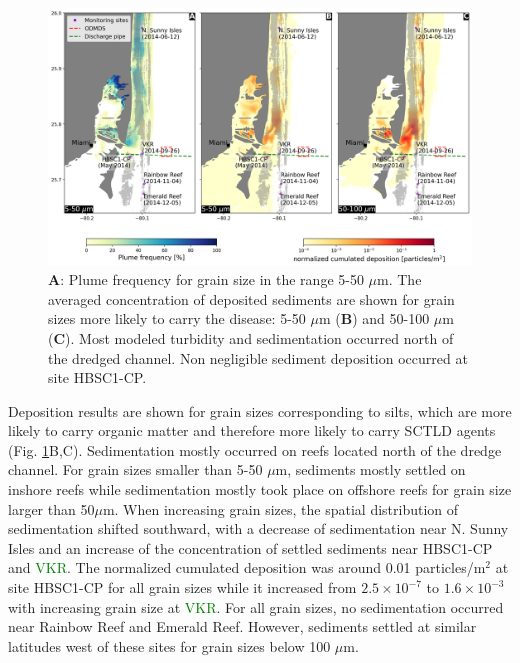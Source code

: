 \documentclass[preprint,12pt,authoryear]{elsarticle}
\newcommand{\modif}[1]{\textcolor{green}{#1}}
\begin{document}
\begin{figure}
	\centering
	\includegraphics[width=\textwidth]{figures/plume_deposition_new.png}
	\caption{\textbf{A}: Plume frequency for grain size in the range 5-50 $\mu$m. The averaged concentration of deposited sediments are shown for grain sizes more likely to carry the disease: 5-50 $\mu$m (\textbf{B}) and 50-100 $\mu$m (\textbf{C}). Most modeled turbidity and sedimentation occurred north of the dredged channel. Non negligible sediment deposition occurred at site HBSC1-CP.}
	\label{fig:onset_depo}    
\end{figure}

Deposition results are shown for grain sizes corresponding to silts, which are more likely to carry organic matter and therefore more likely to carry SCTLD agents \citep{erftemeijer2012environmental}(Fig. \ref{fig:onset_depo}B,C). Sedimentation mostly occurred on reefs located north of the dredge channel. For grain sizes smaller than 5-50 $\mu$m, sediments mostly settled on inshore reefs while sedimentation mostly took place on offshore reefs for grain size larger than 50$\mu$m. When increasing grain sizes, the spatial distribution of sedimentation shifted southward, with a decrease of sedimentation near N. Sunny Isles and an increase of the concentration of settled sediments near HBSC1-CP and \modif{VKR}. The normalized cumulated deposition was around 0.01 particles/m$^2$ at site HBSC1-CP for all grain sizes while it increased from $2.5\times 10^{-7}$ to $1.6\times 10^{-3}$ with increasing grain size at \modif{VKR}. For all grain sizes, no sedimentation occurred near Rainbow Reef and Emerald Reef. However, sediments settled at similar latitudes west of these sites for grain sizes below 100 $\mu$m.
\end{document}
